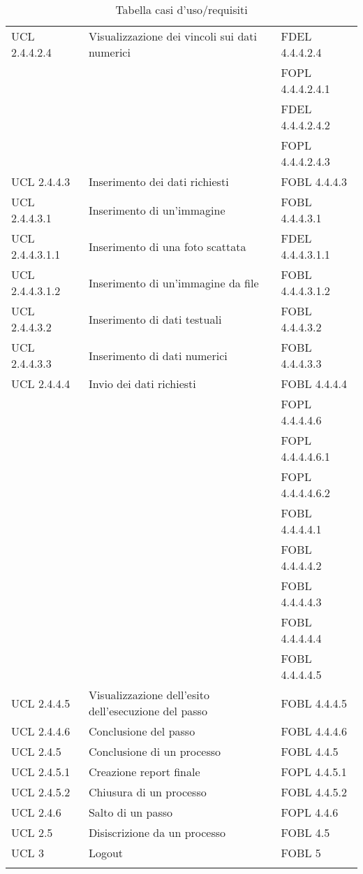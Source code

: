 \begin{longtable}{lXp{}}
UCL 2.4.4.2.4&Visualizzazione dei vincoli sui dati numerici&FDEL 4.4.4.2.4\\
&&FOPL 4.4.4.2.4.1\\ 
&&FDEL 4.4.4.2.4.2\\ 
&&FOPL 4.4.4.2.4.3\\ 
\midrule 
UCL 2.4.4.3&Inserimento dei dati richiesti&FOBL 4.4.4.3\\ 
\midrule 
UCL 2.4.4.3.1&Inserimento di un'immagine&FOBL 4.4.4.3.1\\ 
\midrule 
UCL 2.4.4.3.1.1&Inserimento di una foto scattata&FDEL 4.4.4.3.1.1\\ 
\midrule 
UCL 2.4.4.3.1.2&Inserimento di un'immagine da file&FOBL 4.4.4.3.1.2\\ 
\midrule 
UCL 2.4.4.3.2&Inserimento di dati testuali&FOBL 4.4.4.3.2\\ 
\midrule 
UCL 2.4.4.3.3&Inserimento di dati numerici&FOBL 4.4.4.3.3\\ 
\midrule 
UCL 2.4.4.4&Invio dei dati richiesti&FOBL 4.4.4.4\\
&&FOPL 4.4.4.4.6\\
&&FOPL 4.4.4.4.6.1\\
&&FOPL 4.4.4.4.6.2\\
&&FOBL 4.4.4.4.1\\ 
&&FOBL 4.4.4.4.2\\ 
&&FOBL 4.4.4.4.3\\
&&FOBL 4.4.4.4.4\\ 
&&FOBL 4.4.4.4.5\\
\midrule 
UCL 2.4.4.5&Visualizzazione dell'esito dell'esecuzione del passo&FOBL 4.4.4.5\\ 
\midrule 
UCL 2.4.4.6&Conclusione del passo&FOBL 4.4.4.6\\ 
\midrule 
UCL 2.4.5&Conclusione di un processo&FOBL 4.4.5\\
\midrule
UCL 2.4.5.1&Creazione report finale&FOPL 4.4.5.1\\ 
\midrule 
UCL 2.4.5.2&Chiusura di un processo&FOBL 4.4.5.2\\ 
\midrule
UCL 2.4.6&Salto di un passo&FOPL 4.4.6\\ 
\midrule  
UCL 2.5&Disiscrizione da un processo&FOBL 4.5\\ 
\midrule 
UCL 3&Logout&FOBL 5\\ 
\bottomrule
\caption{Tabella casi d'uso/requisiti}
\end{longtable} 